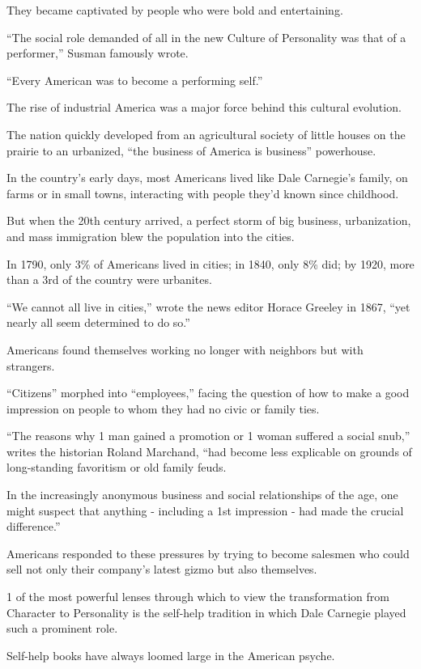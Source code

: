 \documentclass[oneside]{article}
\numberwithin{equation}{section}
\begin{document}
They became captivated by people who were bold and entertaining.

``The social role demanded of all in the new Culture of Personality was that of a performer,'' Susman famously wrote.

``Every American was to become a performing self.''

%
The rise of industrial America was a major force behind this cultural evolution.

The nation quickly developed from an agricultural society of little houses on the prairie to an urbanized, ``the business of America is business'' powerhouse.

In the country's early days, most Americans lived like Dale Carnegie's family, on farms or in small towns, interacting with people they'd known since childhood.

But when the 20th century arrived, a perfect storm of big business, urbanization, and mass immigration blew the population into the cities.

In 1790, only 3\% of Americans lived in cities; in 1840, only 8\% did; by 1920, more than a 3rd of the country were urbanites.

``We cannot all live in cities,'' wrote the news editor Horace Greeley in 1867, ``yet nearly all seem determined to do so.''

%
Americans found themselves working no longer with neighbors but with strangers.

``Citizens'' morphed into ``employees,'' facing the question of how to make a good impression on people to whom they had no civic or family ties.

``The reasons why 1 man gained a promotion or 1 woman suffered a social snub,'' writes the historian Roland Marchand, ``had become less explicable on grounds of long-standing favoritism or old family feuds.

In the increasingly anonymous business and social relationships of the age, one might suspect that anything - including a 1st impression - had made the crucial difference.''

Americans responded to these pressures by trying to become salesmen who could sell not only their company's latest gizmo but also themselves.

%
1 of the most powerful lenses through which to view the transformation from Character to Personality is the self-help tradition in which Dale Carnegie played such a prominent role.

Self-help books have always loomed large in the American psyche.
\end{document}
